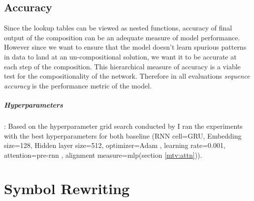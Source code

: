 \subsection{Accuracy}
Since the lookup tables can be viewed as nested functions, accuracy of final output of the composition can be an adequate measure of model performance. However since we want to ensure that the model doesn't learn spurious patterns in data to land at an un-compositional solution, we want it to be accurate at each step of the composition. This hierarchical measure of accuracy is a viable test for the compositionality of the network. Therefore in all evaluations \textit{sequence accuracy} is the performance metric of the model.

\subparagraph{Hyperparameters}: Based on the hyperparameter grid search conducted by \cite{Hupkes2018} I ran the experiments with the best hyperparameters for both baseline (RNN cell=GRU, Embedding size=128, Hidden layer size=512, optimizer=Adam \citep{KingmaB14}, learning rate=0.001, attention=pre-rnn \citep{Bahdanau2014}, alignment measure=mlp(section \ref{mtv:attn})).

\section{Symbol Rewriting} \label{exp:sr}

